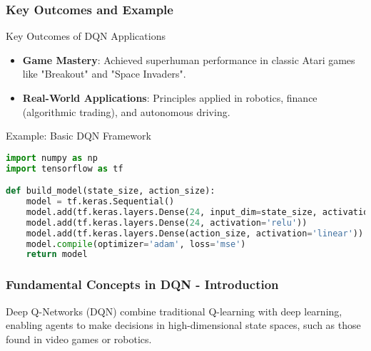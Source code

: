 \documentclass[aspectratio=169]{beamer}
\begin{document}
\begin{frame}[fragile]
    \frametitle{Key Outcomes and Example}
    
    \begin{block}{Key Outcomes of DQN Applications}
        \begin{itemize}
            \item \textbf{Game Mastery}: Achieved superhuman performance in classic Atari games like "Breakout" and "Space Invaders".
            \item \textbf{Real-World Applications}: Principles applied in robotics, finance (algorithmic trading), and autonomous driving.
        \end{itemize}
    \end{block}
    
    \begin{block}{Example: Basic DQN Framework}
        \begin{lstlisting}[language=Python]
import numpy as np
import tensorflow as tf

def build_model(state_size, action_size):
    model = tf.keras.Sequential()
    model.add(tf.keras.layers.Dense(24, input_dim=state_size, activation='relu'))
    model.add(tf.keras.layers.Dense(24, activation='relu'))
    model.add(tf.keras.layers.Dense(action_size, activation='linear'))
    model.compile(optimizer='adam', loss='mse')
    return model
        \end{lstlisting}
    \end{block}    
\end{frame}

\begin{frame}[fragile]
    \frametitle{Fundamental Concepts in DQN - Introduction}
    Deep Q-Networks (DQN) combine traditional Q-learning with deep learning, enabling agents to make decisions in high-dimensional state spaces, such as those found in video games or robotics.
\end{frame}
\end{document}

